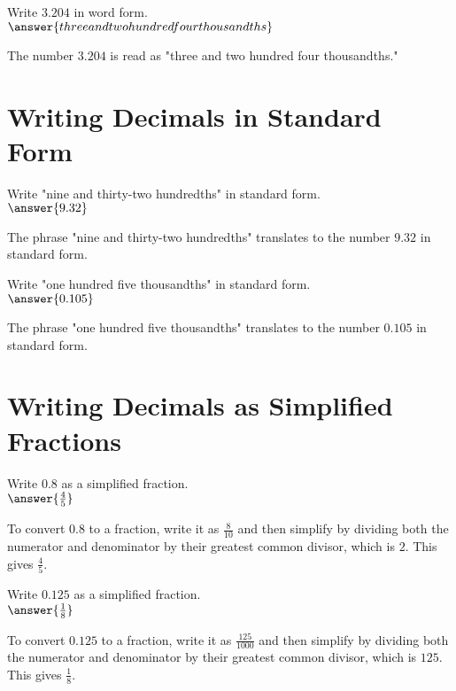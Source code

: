 \documentclass{ximera}
\begin{document}
\begin{problem}
Write $3.204$ in word form.\\
$\answer{three and two hundred four thousandths}$
\begin{feedback}
The number $3.204$ is read as "three and two hundred four thousandths."
\end{feedback}
\end{problem}

\section*{Writing Decimals in Standard Form}

\begin{problem}
Write "nine and thirty-two hundredths" in standard form.\\
$\answer{9.32}$
\begin{feedback}
The phrase "nine and thirty-two hundredths" translates to the number $9.32$ in standard form.
\end{feedback}
\end{problem}

\begin{problem}
Write "one hundred five thousandths" in standard form.\\
$\answer{0.105}$
\begin{feedback}
The phrase "one hundred five thousandths" translates to the number $0.105$ in standard form.
\end{feedback}
\end{problem}

\section*{Writing Decimals as Simplified Fractions}

\begin{problem}
Write $0.8$ as a simplified fraction.\\
$\answer{\frac{4}{5}}$
\begin{feedback}
To convert $0.8$ to a fraction, write it as $\frac{8}{10}$ and then simplify by dividing both the numerator and denominator by their greatest common divisor, which is $2$. This gives $\frac{4}{5}$.
\end{feedback}
\end{problem}

\begin{problem}
Write $0.125$ as a simplified fraction.\\
$\answer{\frac{1}{8}}$
\begin{feedback}
To convert $0.125$ to a fraction, write it as $\frac{125}{1000}$ and then simplify by dividing both the numerator and denominator by their greatest common divisor, which is $125$. This gives $\frac{1}{8}$.
\end{feedback}
\end{problem}
\end{document}
